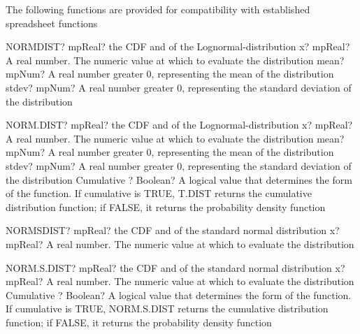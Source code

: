 \vspace{0.6cm}

The following functions are provided for compatibility with established spreadsheet functions

\vspace{0.3cm}
\begin{mpFunctionsExtract}
	\mpWorksheetFunctionThreeNotImplemented
	{NORMDIST? mpReal? the CDF and of the Lognormal-distribution}
	{x? mpReal? A real number. The numeric value at which to evaluate the distribution}
	{mean? mpNum? A real number greater 0, representing the mean of the distribution}
	{stdev? mpNum? A real number greater 0, representing the standard deviation of the distribution}
\end{mpFunctionsExtract}

\vspace{0.6cm}
\begin{mpFunctionsExtract}
	\mpWorksheetFunctionFourNotImplemented
	{NORM.DIST? mpReal? the CDF and of the Lognormal-distribution}
	{x? mpReal? A real number. The numeric value at which to evaluate the distribution}
	{mean? mpNum? A real number greater 0, representing the mean of the distribution}
	{stdev? mpNum? A real number greater 0, representing the standard deviation of the distribution}
	{Cumulative ? Boolean? A logical value that determines the form of the function. If cumulative is TRUE, T.DIST returns the cumulative distribution function; if FALSE, it returns the probability density function}
\end{mpFunctionsExtract}


\vspace{0.6cm}
\begin{mpFunctionsExtract}
	\mpWorksheetFunctionOneNotImplemented
	{NORMSDIST? mpReal? the CDF and of the  standard normal distribution}
	{x? mpReal? A real number. The numeric value at which to evaluate the distribution}
\end{mpFunctionsExtract}

\vspace{0.6cm}
\begin{mpFunctionsExtract}
	\mpWorksheetFunctionTwoNotImplemented
	{NORM.S.DIST? mpReal? the CDF and of the  standard normal distribution}
	{x? mpReal? A real number. The numeric value at which to evaluate the distribution}
	{Cumulative ? Boolean? A logical value that determines the form of the function. If cumulative is TRUE, NORM.S.DIST returns the cumulative distribution function; if FALSE, it returns the probability density function}
\end{mpFunctionsExtract}


